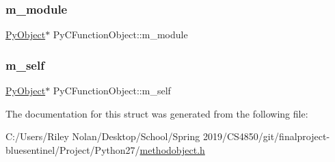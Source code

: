 \subsubsection{\texorpdfstring{m\_module}{m\_module}}
{\footnotesize\ttfamily \mbox{\hyperlink{_python27_2object_8h_aadc84ac7aed2cfa6f20c25f62bf3dac7}{Py\+Object}}$\ast$ Py\+C\+Function\+Object\+::m\+\_\+module}

\mbox{\label{struct_py_c_function_object_ad7a57b447920bb7a57224af1ac55383c}} 
\subsubsection{\texorpdfstring{m\_self}{m\_self}}
{\footnotesize\ttfamily \mbox{\hyperlink{_python27_2object_8h_aadc84ac7aed2cfa6f20c25f62bf3dac7}{Py\+Object}}$\ast$ Py\+C\+Function\+Object\+::m\+\_\+self}



The documentation for this struct was generated from the following file\+:\begin{DoxyCompactItemize}
\item 
C\+:/\+Users/\+Riley Nolan/\+Desktop/\+School/\+Spring 2019/\+C\+S4850/git/finalproject-\/bluesentinel/\+Project/\+Python27/\mbox{\hyperlink{methodobject_8h}{methodobject.\+h}}\end{DoxyCompactItemize}
